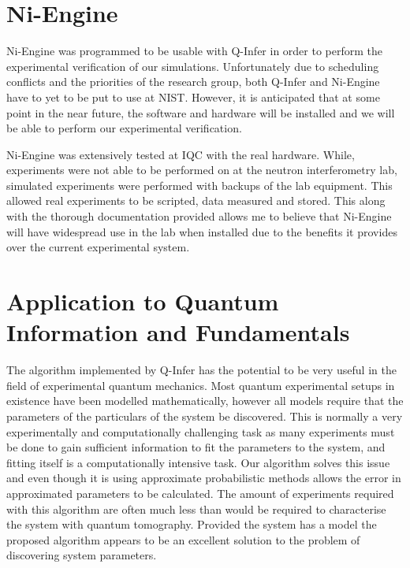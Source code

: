 \section{Ni-Engine}
Ni-Engine was programmed to be usable with Q-Infer in order to perform the experimental verification of our simulations. Unfortunately due to scheduling conflicts and the priorities of the research group, both Q-Infer and Ni-Engine have to yet to be put to use at NIST. However, it is anticipated that at some point in the near future, the software and hardware will be installed and we will be able to perform our experimental verification. 

Ni-Engine was extensively tested at IQC with the real hardware. While, experiments were not able to be performed on at the neutron interferometry lab, simulated experiments were performed with backups of the lab equipment. This allowed real experiments to be scripted, data measured and stored. This along with the thorough documentation provided allows me to believe that Ni-Engine will have widespread use in the lab when installed due to the benefits it provides over the current experimental system. 

\section{Application to Quantum Information and Fundamentals}
The algorithm implemented by Q-Infer has the potential to be very useful in the field of experimental quantum mechanics. Most quantum experimental setups in existence have been modelled mathematically, however all models require that the parameters of the particulars of the system be discovered. This is normally a very experimentally and computationally challenging task as many experiments must be done to gain sufficient information to fit the parameters to the system, and fitting itself is a computationally intensive task. Our algorithm solves this issue and even though it is using approximate probabilistic methods allows the error in approximated parameters to be calculated. The amount of experiments required with this algorithm are often much less than would be required to characterise the system with quantum tomography. Provided the system has a model the proposed algorithm appears to be an excellent solution to the problem of discovering system parameters. 


